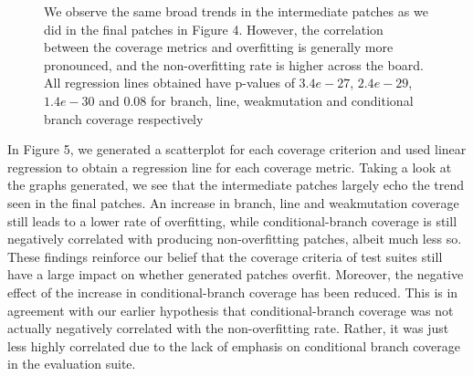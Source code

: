 \documentclass[titlepage]{article}
\begin{document}
\begin{figure}
    \caption{We observe the same broad trends in the intermediate patches as we did in the final patches in Figure 4. However, the correlation between the coverage metrics and overfitting is generally more pronounced, and the non-overfitting rate is higher across the board. All regression lines obtained have p-values of $3.4e-27$, $2.4e-29$, $1.4e-30$ and 0.08 for branch, line, weakmutation and conditional branch coverage respectively}
    \centering
\end{figure}

In Figure 5, we generated a scatterplot for each coverage criterion and used linear regression to obtain a regression line for each coverage metric. Taking a look at the graphs generated, we see that the intermediate patches largely echo the trend seen in the final patches. An increase in branch, line and weakmutation coverage still leads to a lower rate of overfitting, while conditional-branch coverage is still negatively correlated with producing non-overfitting patches, albeit much less so. These findings reinforce our belief that the coverage criteria of test suites still have a large impact on whether generated patches overfit. Moreover, the negative effect of the increase in conditional-branch coverage has been reduced. This is in agreement with our earlier hypothesis that conditional-branch coverage was not actually negatively correlated with the non-overfitting rate. Rather, it was just less highly correlated due to the lack of emphasis on conditional branch coverage in the evaluation suite. 
\end{document}
